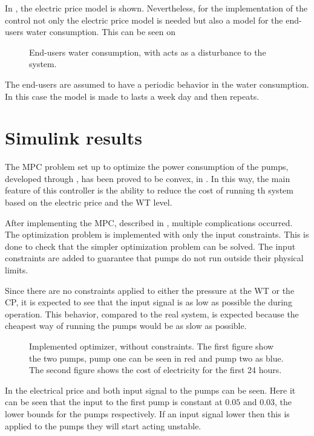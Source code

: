 In , the electric price model is shown. Nevertheless, for the implementation of the control not only the electric price model is needed but also a model for the end-users water consumption. This can be seen on 

\begin{figure}[H]
\centering
 
\caption{End-users water consumption, with acts as a disturbance to the system.}
\label{fig:water_consumption}
\end{figure}

The end-users are assumed to have a periodic behavior in the water consumption. In this case the model is made to lasts a week day and then repeats. 


\section{Simulink results}
The MPC problem set up to optimize the power consumption of the pumps, developed through , has been proved to be convex, in . In this way, the main feature of this controller is the ability to reduce the cost of running th system based on the electric price and the WT level. 

After implementing the MPC, described in , multiple complications occurred. The optimization problem is implemented with only the input constraints. This is done to check that the simpler optimization problem can be solved. The input constraints are added to guarantee that pumps do not run outside their physical limits. 

Since there are no constraints applied to either the pressure at the WT or the CP, it is expected to see that the input signal is as low as possible the during operation. This behavior, compared to the real system, is expected because the cheapest way of running the pumps would be as slow as possible. 

\begin{figure}[H]
\centering
 
\caption{Implemented optimizer, without constraints. The first figure show the two pumps, pump one can be seen in red and pump two as blue. The second figure shows the cost of electricity for the first 24 hours.}
\label{fig:Implementation_shit}
\end{figure}

In  the electrical price and both input signal to the pumps can be seen. Here it can be seen that the input to the first pump is constant at $0.05$ and $0.03$, the lower bounds for the pumps respectively. If an input signal lower then this is applied to the pumps they will start acting unstable. 

